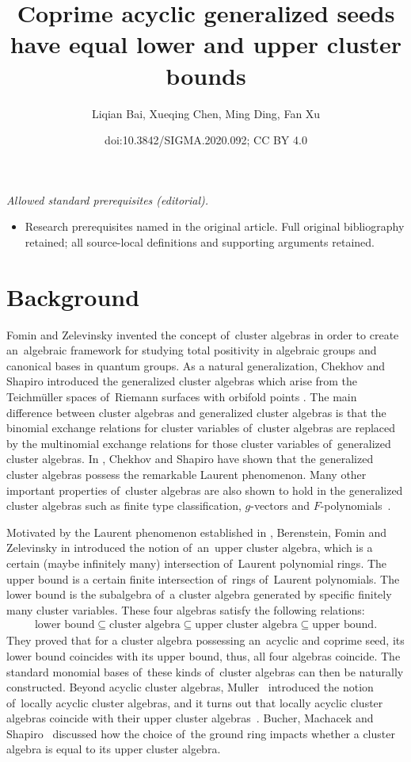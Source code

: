 \documentclass[10pt,a4paper]{amsart}
\title{Coprime acyclic generalized seeds have equal lower and upper cluster bounds}
\author{Liqian Bai, Xueqing Chen, Ming Ding, Fan Xu}
\date{doi:10.3842/SIGMA.2020.092; CC BY 4.0}
\numberwithin{equation}{section}
\begin{document}
\maketitle
\noindent\textit{Allowed standard prerequisites (editorial).}\begin{itemize}
\item Research prerequisites named in the original article. Full original bibliography retained; all source-local definitions and supporting arguments retained.
\end{itemize}\medskip
\section{Background}
Fomin and Zelevinsky invented the concept of~cluster algebras \cite{ca1,ca2} in order
to create an~algebraic framework for studying total positivity in algebraic groups and canonical bases in quantum groups. As a natural generalization,
Chekhov and Shapiro introduced the generalized cluster algebras which arise from the Teichm\"{u}ller spaces of~Riemann surfaces with orbifold points \cite{CS}.
The main difference between cluster algebras and generalized cluster algebras is that the binomial exchange relations for cluster
variables of~cluster algebras are replaced by the multinomial exchange relations for those cluster
variables of~generalized cluster algebras. In \cite{CS}, Chekhov and Shapiro have shown that the generalized cluster algebras possess the remarkable Laurent phenomenon. Many other important properties of~cluster algebras are also shown to hold in the generalized cluster algebras such as finite type classification, $g$-vectors and $F$-polynomials~\cite{CS, nak2}.


Motivated by the Laurent phenomenon established in \cite{ca1}, Berenstein, Fomin and Zelevinsky in \cite{bfz} introduced the notion of~an~upper cluster algebra, which is a certain (maybe infinitely many) intersection of~Laurent polynomial rings.
The upper bound is a certain finite intersection of~rings of~Laurent polynomials.
The lower bound is the subalgebra of~a cluster algebra generated by specific finitely many cluster variables.
These four algebras satisfy the following relations:
\begin{gather*}
 \text{lower bound}\subseteq \text{cluster algebra}\subseteq \text{upper cluster algebra}\subseteq \text{upper bound}.
\end{gather*}
They proved that for a cluster algebra possessing an~acyclic and coprime seed, its lower bound coincides with its upper bound, thus, all four algebras coincide. The standard monomial bases of~these kinds of~cluster algebras can then be naturally constructed.
Beyond acyclic cluster algebras, Muller~\cite{muller13} introduced the notion of~locally acyclic cluster algebras, and it turns out that locally acyclic cluster algebras coincide with their upper cluster algebras~\cite{muller13, muller14}. Bucher, Machacek and Shapiro~\cite{BMS} discussed how the choice of~the ground ring impacts whether a cluster algebra is equal to its upper cluster algebra.
\end{document}
